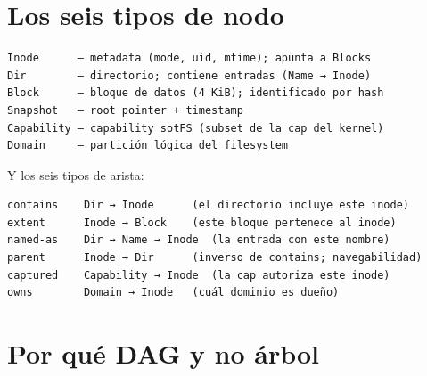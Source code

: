 \section{Los seis tipos de nodo}

\begin{lstlisting}[frame=single, basicstyle=\ttfamily\scriptsize]
Inode      — metadata (mode, uid, mtime); apunta a Blocks
Dir        — directorio; contiene entradas (Name → Inode)
Block      — bloque de datos (4 KiB); identificado por hash
Snapshot   — root pointer + timestamp
Capability — capability sotFS (subset de la cap del kernel)
Domain     — partición lógica del filesystem
\end{lstlisting}

Y los seis tipos de arista:

\begin{lstlisting}[frame=single, basicstyle=\ttfamily\scriptsize]
contains    Dir → Inode      (el directorio incluye este inode)
extent      Inode → Block    (este bloque pertenece al inode)
named-as    Dir → Name → Inode  (la entrada con este nombre)
parent      Inode → Dir      (inverso de contains; navegabilidad)
captured    Capability → Inode  (la cap autoriza este inode)
owns        Domain → Inode   (cuál dominio es dueño)
\end{lstlisting}

\section{Por qué DAG y no árbol}

